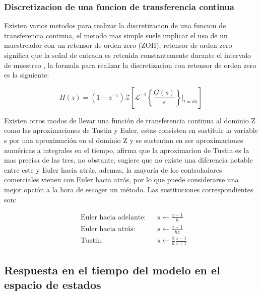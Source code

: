         \subsubsection{Discretizacion de una funcion de transferencia continua}
            
            Existen varios metodos para realizar la discretizacion de una funcion de transferencia continua, el metodo mas simple suele implicar el uso de un muestreador con un retensor de orden zero (ZOH), retensor de orden zero significa que la señal de entrada es retenida constantemente durante el intervalo de muestreo \Parencite{haugen2005discrete}, la formula para realizar la discretizacion con retensor de orden zero es la siguiente:

            \begin{equation}\label{eq:ZOH}
                H(z) = (1 - z^{-1}) \mathcal{Z} \left[ \mathcal{L}^{-1}\left\lbrace \frac{G(s)}{s}\right\rbrace\Bigr|_{t=kh}\right]
            \end{equation}

            Existen otros modos de llevar una función de transferencia continua al dominio Z como las aproximaciones de Tustin y Euler, estas consisten en sustituir la variable s por una aproximación en el dominio Z y se sustentan en ser aproximaciones numéricas a integrales en el tiempo, \textcite{haugen2005discrete} afirma que la aproximacion de Tustin es la mas precisa de las tres, no obstante, sugiere que no existe una diferencia notable entre este y Euler hacia atrás, ademas, la mayoría de los controladores comerciales vienen con Euler hacia atrás, por lo que puede considerarse una mejor opción a la hora de escoger un método. Las sustituciones correspondientes son:

            \begin{align}
                &\text{Euler hacia adelante:}& &s \leftarrow \frac{z - 1}{h} \label{eq:eulerF}\\
                &\text{Euler hacia atrás:}& &s \leftarrow \frac{z - 1}{hz} \label{eq:eulerB}\\
                &\text{Tustin:}& &s \leftarrow \frac{2}{h} \frac{z-1}{z+1} \label{eq:tustin}
            \end{align}
    
    \subsection{Respuesta en el tiempo del modelo en el espacio de estados}
        
